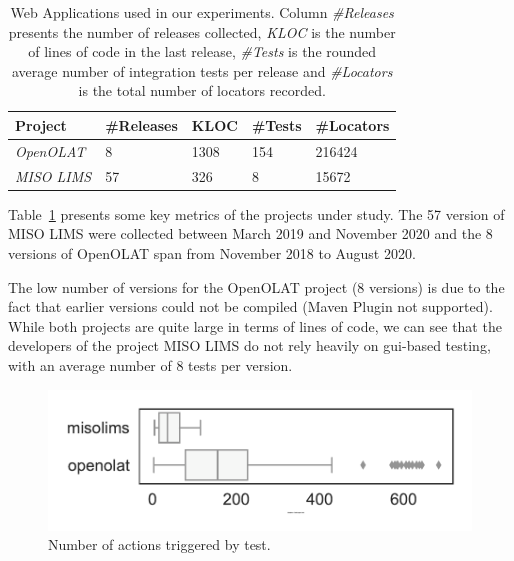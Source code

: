 \begin{table}
\centering
\caption{Web Applications used in our experiments. Column \emph{\#Releases} presents the number of releases collected, \emph{KLOC} is the number of lines of code in the last release, \emph{\#Tests} is the rounded average number of integration tests per release and \emph{\#Locators} is the total number of locators recorded.}
\label{tab:hpath-protocol-projects}
\begin{tabular}{>{\raggedright}m{0.4in}>{\raggedleft}m{0.4in}>{\raggedleft}m{0.4in}>{\raggedleft}m{0.4in}>{\raggedleft}m{0.4in}}
\toprule
\textbf{\scriptsize{Project}} & \textbf{\scriptsize{\#Releases}} & \textbf{\scriptsize{KLOC}} & \textbf{\scriptsize{\#Tests}} & \textbf{\scriptsize{\#Locators}} \tabularnewline
\toprule
\scriptsize{\textit{OpenOLAT}} & \scriptsize{8} & \scriptsize{1308} & \scriptsize{154} & \scriptsize{216424} \tabularnewline
\scriptsize{\textit{MISO LIMS}} & \scriptsize{57} & \scriptsize{326} & \scriptsize{8} & \scriptsize{15672} \tabularnewline
\bottomrule
\end{tabular}
\end{table}

Table~\ref{tab:hpath-protocol-projects} presents some key metrics of the projects under study. The 57 version of MISO LIMS were collected between March 2019 and November 2020 and the 8 versions of OpenOLAT span from November 2018 to August 2020. 

The low number of versions for the OpenOLAT project (8 versions) is due to the fact that earlier versions could not be compiled (Maven Plugin not supported). While both projects are quite large in terms of lines of code, we can see that the developers of the project MISO LIMS do not rely heavily on \gls{gui}-based testing, with an average number of 8 tests per version.

\begin{figure}
\centering
\includegraphics[width=0.8\columnwidth]{figures/hpath/selector-per-test-dist.pdf}
\caption{Number of actions triggered by test.}  
\label{fig:hpath-protocol-actions}
\end{figure}


